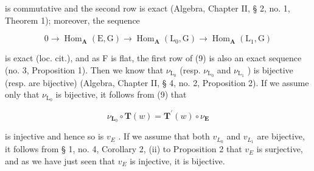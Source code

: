 is commutative and the second row is exact (Algebra, Chapter II, § 2, no. 1, Theorem 1); moreover, the sequence

\[
0 \rightarrow \operatorname{Hom} _ {\mathbf {A}} (\mathrm{E}, \mathrm{G}) \rightarrow \operatorname{Hom} _ {\mathbf {A}} (\mathrm{L} _ {0}, \mathrm{G}) \rightarrow \operatorname{Hom} _ {\mathbf {A}} (\mathrm{L} _ {1}, \mathrm{G})
\]

is exact (loc. cit.), and as F is flat, the first row of (9) is also an exact sequence (no. 3, Proposition 1). Then we know that \(\nu_{\mathrm{L}_0}\) (resp. \(\nu_{\mathrm{L}_0}\) and \(\nu_{\mathrm{L}_1}\) ) is bijective (resp. are bijective) (Algebra, Chapter II, § 4, no. 2, Proposition 2). If we assume only that \(\nu_{\mathrm{L}_0}\) is bijective, it follows from (9) that

\[
\nu_ {\mathbf {L} _ {0}} \circ \mathbf {T} (w) = \mathbf {T} ^ {\prime} (w) \circ \nu_ {\mathbf {E}}
\]

is injective and hence so is \(v_{E}\) . If we assume that both \(v_{L_{0}}\) and \(v_{L_{1}}\) are bijective, it follows from § 1, no. 4, Corollary 2, (ii) to Proposition 2 that \(v_{E}\) is surjective, and as we have just seen that \(v_{E}\) is injective, it is bijective.

